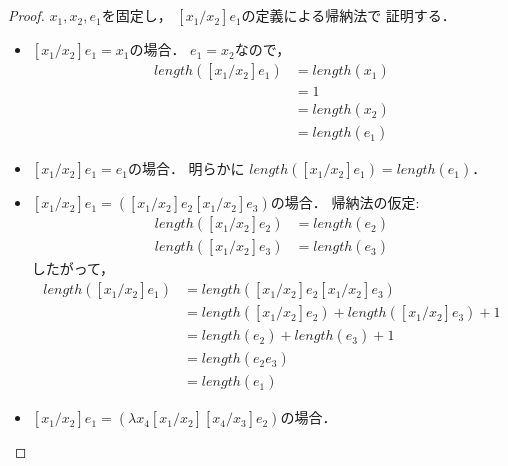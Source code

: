 \documentclass{ltjsbook}%
\begin{document}
\begin{proof}%
  $\mathit{x}_1^{},\mathit{x}_2^{},\mathit{e}_1^{}$を固定し，%
  $[\mathit{x}_1^{}/\mathit{x}_2^{}]\mathit{e}_1^{}$の定義による帰納法で%
  証明する．%
  \begin{itemize}%
  \item $[\mathit{x}_1^{}/\mathit{x}_2^{}]\mathit{e}_1^{} = \mathit{x}_1^{}$の場合．%
    $\mathit{e}_1^{} = \mathit{x}_2^{}$なので，%
    \begin{align}%
      length([\mathit{x}_1^{}/\mathit{x}_2^{}]\mathit{e}_1^{})&=length(\mathit{x}_1^{})\\%
      &=1\\%
      &=length(\mathit{x}_2^{})\\%
      &=length(\mathit{e}_1^{})%
    \end{align}%
  \item $[\mathit{x}_1^{}/\mathit{x}_2^{}]\mathit{e}_1^{} = \mathit{e}_1^{}$の場合．%
    明らかに%
    $length([\mathit{x}_1^{}/\mathit{x}_2^{}]\mathit{e}_1^{})=length(\mathit{e}_1^{})$．%
  \item $[\mathit{x}_1^{}/\mathit{x}_2^{}]\mathit{e}_1^{}%
    = ([\mathit{x}_1^{}/\mathit{x}_2^{}]\mathit{e}_2^{}[\mathit{x}_1^{}/\mathit{x}_2^{}]\mathit{e}_3^{})$の場合．%
    帰納法の仮定:%
    \begin{align}%
    length([\mathit{x}_1^{}/\mathit{x}_2^{}]\mathit{e}_2^{})&=length(\mathit{e}_2^{})\\%
    length([\mathit{x}_1^{}/\mathit{x}_2^{}]\mathit{e}_3^{})&=length(\mathit{e}_3^{})%
    \end{align}%
    したがって，%
    \begin{align}%
    length([\mathit{x}_1^{}/\mathit{x}_2^{}]\mathit{e}_1^{})%
    &=length([\mathit{x}_1^{}/\mathit{x}_2^{}]\mathit{e}_2^{}%
    [\mathit{x}_1^{}/\mathit{x}_2^{}]\mathit{e}_3^{})\\%
    &=length([\mathit{x}_1^{}/\mathit{x}_2^{}]\mathit{e}_2^{})%
    +length([\mathit{x}_1^{}/\mathit{x}_2^{}]\mathit{e}_3^{})+1\\%
    &=length(\mathit{e}_2^{})+length(\mathit{e}_3^{})+1\\%
    &=length(\mathit{e}_2^{}\mathit{e}_3^{})\\%
    &=length(\mathit{e}_1^{})%
    \end{align}%
  \item $[\mathit{x}_1^{}/\mathit{x}_2^{}]\mathit{e}_1^{}%
    = (\lambda\mathit{x}_4^{}[\mathit{x}_1^{}/\mathit{x}_2^{}]%
    [\mathit{x}_4^{}/\mathit{x}_3^{}]\mathit{e}_2^{})$の場合．%

\end{itemize}
\end{proof}
\end{document}
